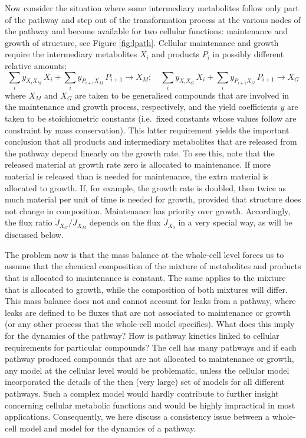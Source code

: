 Now consider the situation where some intermediary metabolites follow only part of the pathway and step out of the transformation process at the various nodes of the pathway and become available for two cellular functions: 
maintenance and growth of structure, see Figure \ref{fig:lpath}. 
Cellular maintenance and growth require the intermediary metabolites $X_i$ and products $P_i$ in possibly different relative amounts:
\begin{equation} \label{eqn:MG}
  \sum_i y_{X_i X_M} \, X_i + \sum_i y_{P_{i + 1} X_M} \, P_{i + 1} 
     \rightarrow X_M; \quad
  \sum_i y_{X_i X_G} \, X_i + \sum_i y_{P_{i + 1} X_G} \, P_{i + 1} 
      \rightarrow X_G
\end{equation}
where $X_M$ and $X_G$ are taken to be generalised compounds that are involved in the maintenance and growth process, respectively, and the yield coefficients $y$ are taken to be stoichiometric constants (i.e.\ fixed constants whose values follow are constraint by mass conservation). 
This latter requirement yields the important conclusion that all products and intermediary metabolites that are released from the pathway depend linearly on the growth rate. 
To see this, note that the released material at growth rate zero is allocated to maintenance. 
If more material is released than is needed for maintenance, the extra material is allocated to growth. 
If, for example, the growth rate is doubled, then twice as much material per unit of time is needed for growth, provided that structure does not change in composition. 
Maintenance has priority over growth. 
Accordingly, the flux ratio $\dot{J}_{X_G}/ \dot{J}_{X_M}$ depends on the flux $\dot{J}_{X_0}$ in a very special way, as will be discussed below.

The problem now is that the mass balance at the whole-cell level forces us to assume that the chemical composition of the mixture of metabolites and products that is allocated to maintenance is constant.
The same applies to the mixture that is allocated to growth, while the composition of both mixtures will differ. 
This mass balance does not and cannot account for leaks from a pathway, where leaks are defined to be fluxes that are not associated to maintenance or growth (or any other process that the whole-cell model specifies). 
What does this imply for the dynamics of the pathway? 
How is pathway kinetics linked to cellular requirements for particular compounds? 
The cell has many pathways and if each pathway produced compounds that are not allocated to maintenance or growth, any model at the cellular level would be problematic, unless the cellular model incorporated the details of the then (very large) set of models for all different pathways. 
Such a complex model would hardly contribute to further insight concerning cellular metabolic functions and would be highly impractical in most applications. 
Consequently, we here discuss a consistency issue between a whole-cell model and model for the dynamics of a pathway.

